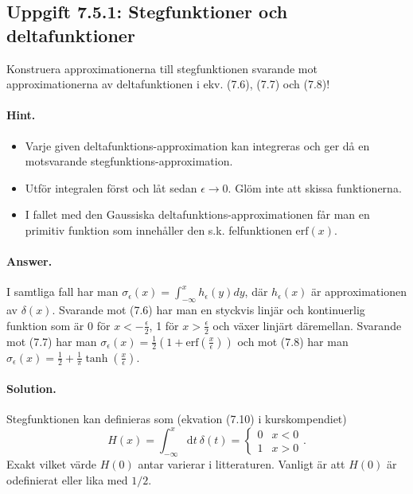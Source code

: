 \documentclass[%
oneside,                 %
final,                   %
10pt]{article}
\newenvironment{doconceexercise}{}{}
\newcounter{doconceexercisecounter}
\begin{document}
\begin{doconceexercise}

\subsection{Uppgift 7.5.1: Stegfunktioner och deltafunktioner}

Konstruera approximationerna till stegfunktionen svarande mot approximationerna av deltafunktionen i ekv. (7.6), (7.7) och (7.8)!


\paragraph{Hint.}
\begin{itemize}
\item Varje given deltafunktions-approximation kan integreras och ger då en motsvarande stegfunktions-approximation. 

\item Utför integralen först och låt sedan $\epsilon \to 0$. Glöm inte att skissa funktionerna.

\item I fallet med den Gaussiska deltafunktions-approximationen får man en primitiv funktion som innehåller den s.k. felfunktionen $\mathrm{erf}(x)$.
\end{itemize}

\noindent


\paragraph{Answer.}
I samtliga fall har man $\sigma_\epsilon (x)=\int_{-\infty}^x h_\epsilon (y)dy$, där $h_\epsilon(x)$ är approximationen av $\delta(x)$. Svarande mot (7.6) har man en styckvis linjär och kontinuerlig funktion som är 0 för $x<-\frac{\epsilon}{2}$, 1 för $x>\frac{\epsilon}{2}$ och växer linjärt däremellan. Svarande mot (7.7) har man $\sigma_\epsilon(x)=\frac{1}{2}\left(1+\mathrm{erf}(\frac{x}{\epsilon})\right)$ och mot (7.8) har man $\sigma_\epsilon(x)=\frac{1}{2}+\frac{1}{\pi}\tanh(\frac{x}{\epsilon})$.



\paragraph{Solution.}
Stegfunktionen kan definieras som (ekvation (7.10) i kurskompendiet)
\begin{equation}
    H(x) =\int_{-\infty}^x\mathrm dt\ \delta(t)=\left\{\begin{array}{cc}
        0 & x < 0 \\
        1 & x > 0
    \end{array} \right..
    \label{step}
\end{equation}
Exakt vilket värde $H(0)$ antar varierar i litteraturen. Vanligt är att $H(0)$ är odefinierat eller lika med $1/2$. 


\end{doconceexercise}
\end{document}
